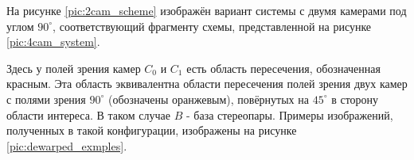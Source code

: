На рисунке \ref{pic:2cam_scheme} изображён вариант системы с двумя камерами под углом $90^\circ$, соответствующий фрагменту схемы,     
  представленной на рисунке \ref{pic:4cam_system}. 


  Здесь у полей зрения камер $C_0$ и $C_1$ есть область пересечения, обозначенная красным. 
Эта область эквивалентна области пересечения полей зрения двух камер с полями зрения $90^\circ$ (обозначены
оранжевым), повёрнутых на $45^\circ$ в сторону области интереса. В таком случае $B$ - база стереопары.
Примеры изображений, полученных в такой конфигурации, изображены на рисунке \ref{pic:dewarped_exmples}. 


